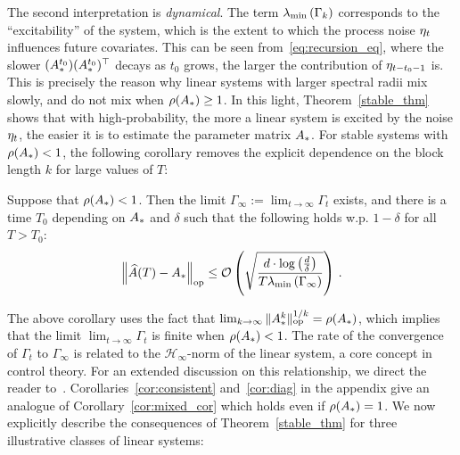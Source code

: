 The second interpretation is \emph{dynamical}. The term $\lambda_{\min}\left(\Gamma_k\right)$ corresponds to the ``excitability'' of the system, which is the extent to which the process noise $\eta_t$ influences future covariates. This can be seen from~\eqref{eq:recursion_eq}, where the slower $(A_{*}^{t_0})(A_{*}^{t_0})^\top$ decays as $t_0$ grows, the larger the contribution of $\eta_{t - t_0-1}$ is. This is precisely the reason why linear systems with larger spectral radii mix slowly, and do not mix when $\rho(A_{*}) \ge 1$.
%
In this light, Theorem~\ref{stable_thm} shows that with high-probability, the more a linear system is excited by the noise $\eta_t$, the easier it is to estimate the parameter matrix $A_{*}$. For stable systems with $\rho(A_{*}) < 1$, the following corollary removes the explicit dependence on the block length $k$ for large values of $T$:
\begin{cor}\label{cor:mixed_cor}
Suppose that $\rho(A_{*}) < 1$. Then the limit $\Gamma_{\infty} := \lim_{t \to \infty} \Gamma_t$ exists, and there is a time $T_0$ depending on $A_{*}$ and $\delta$ such that the following holds w.p. $1-\delta$ for all $T > T_0$:
\begin{eqnarray}
\left\lVert \widehat{A}(T)-A_{*} \right\rVert_{\mathrm{op}} \le \operatorname{\mathcal{O}}\left({\sqrt{ \frac{d \cdot \log\left(\frac{d}{\delta} \right)}  {T\lambda_{\min}\left(\Gamma_{\infty}\right)}}}\right)  \,.
\end{eqnarray}
\end{cor}
The above corollary uses the fact that $\lim_{k \to \infty}\|A_{*}^k\|_{\mathrm{op}}^{1/k} = \rho(A_{*})$, which implies that the limit $\lim_{t \to \infty} \Gamma_t$ is finite when $\rho(A_{*}) < 1$. The rate of the convergence of $\Gamma_t$ to $\Gamma_{\infty}$ is related to the $\mathcal{H}_{\infty}$-norm of the linear system, a core concept in control theory. For an extended discussion on this relationship, we direct the reader to~\cite{tu2017non}. Corollaries~\ref{cor:consistent} and~\ref{cor:diag} in the appendix give an analogue of Corollary~\ref{cor:mixed_cor} which holds even if $\rho(A_{*}) = 1$. We now explicitly describe the consequences of Theorem~\ref{stable_thm} for three illustrative classes of linear systems:


